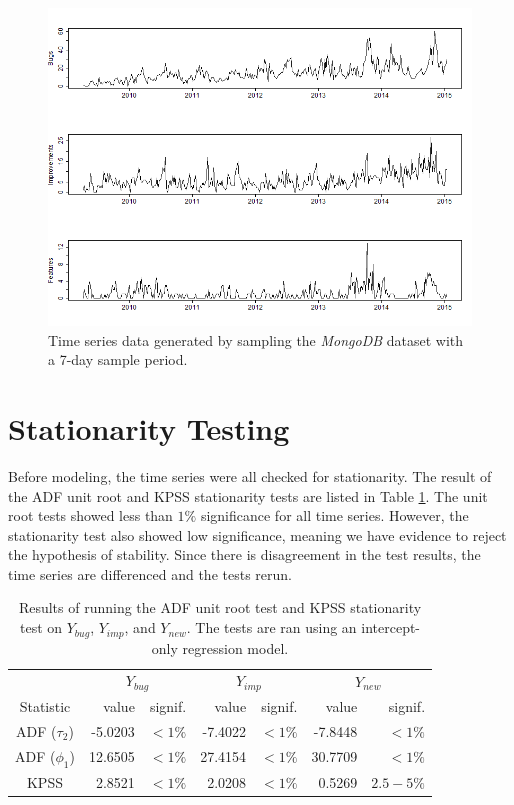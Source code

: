 \documentclass[letterpaper]{report}
\begin{document}
\begin{figure}[htbp]
\begin{center}
\includegraphics[width=\textwidth]{assets/time_series}
\caption[Time series data]{Time series data generated by sampling the \textit{MongoDB} dataset with a 7-day sample period.}
\label{fig:time_series}
\end{center}
\end{figure}

\section*{Stationarity Testing}

Before modeling, the time series were all checked for stationarity. The result of the ADF unit root and KPSS stationarity tests are listed in Table \ref{tab:stationarity_results}. The unit root tests showed less than $1\%$ significance for all time series. However, the stationarity test also showed low significance, meaning we have evidence to reject the hypothesis of stability. Since there is disagreement in the test results, the time series are differenced and the tests rerun.

\begin{table}[htbp]
  \centering
  \begin{tabular}{ c | r r | r r | r r }
      & \multicolumn{2}{|c|}{$Y_{bug}$} & \multicolumn{2}{|c|}{$Y_{imp}$} & \multicolumn{2}{|c}{$Y_{new}$} \\
    Statistic & value & signif. & value & signif. & value & signif. \\
    \hline
    ADF ($\tau_2$) & -5.0203 & $< 1\%$ & -7.4022 & $< 1\%$ & -7.8448 & $< 1\%$ \\
    ADF ($\phi_1$) & 12.6505 & $< 1\%$ & 27.4154 & $< 1\%$ & 30.7709 & $< 1\%$ \\
    KPSS & 2.8521 & $< 1\%$ & 2.0208 & $< 1\%$ & 0.5269 & $2.5-5\%$ \\
    \hline
  \end{tabular}
\caption[Stationarity test results]{Results of running the ADF unit root test and KPSS stationarity test on $Y_{bug}$, $Y_{imp}$, and $Y_{new}$. The tests are ran using an intercept-only regression model.}
\label{tab:stationarity_results}
\end{table}
\end{document}
